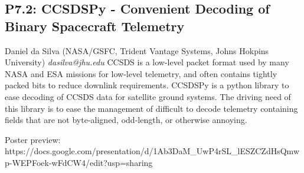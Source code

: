 \documentclass{report}
\begin{document}
\subsection*{P7.2: CCSDSPy - Convenient Decoding of Binary Spacecraft Telemetry}
\bigskip
Daniel da Silva (NASA/GSFC, Trident Vantage Systems, Johns Hokpins University) \newline   \newline   \newline   \newline  \newline  \newline\newline
{\it dasilva@jhu.edu}\newline
\newline\newline
CCSDS is a low-level packet format used by many NASA and ESA missions for low-level telemetry, and often contains tightly packed bits to reduce downlink requirements. CCSDSPy is a python library to ease decoding of CCSDS data for satellite ground systems. The driving need of this library is to ease the management of difficult to decode telemetry containing fields that are not byte-aligned, odd-length, or otherwise annoying.

Poster preview: https://docs.google.com/presentation/d/1Ab3DaM\_UwP4rSL\_lESZCZdHsQmwp-WEPFoek-wFdCW4/edit?usp=sharing\newline
\newpage
\end{document}
